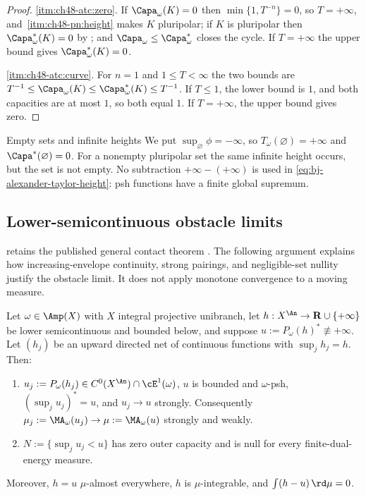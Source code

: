 \begin{proof}
\cref{itm:ch48-atc:zero}.  If $\Capa_\omega(K)=0$ then
$\min\{1,T^{-n}\}=0$, so $T=+\infty$, and
\,\cref{itm:ch48-pn:height} makes
$K$ pluripolar; if $K$ is pluripolar then
$\Capa^*_\omega(K)=0$ by ; and
$\Capa_\omega\le\Capa^*_\omega$ closes the cycle.  If $T=+\infty$ the
upper bound gives $\Capa^*_\omega(K)=0$.

\cref{itm:ch48-atc:curve}. For $n=1$ and $1\le T<\infty$ the
two bounds are
$T^{-1}\le\Capa_\omega(K)\le\Capa^*_\omega(K)\le T^{-1}$.
If $T\le1$, the lower bound is $1$, and both capacities are at most
$1$, so both equal $1$. If $T=+\infty$, the upper bound gives zero.
\end{proof}

\begin{warning}{Empty sets and infinite heights}
\label{warn:ch48-empty-height}
We put $\sup_\varnothing\phi=-\infty$, so
$T_\omega(\varnothing)=+\infty$ and
$\Capa^*(\varnothing)=0$.  For a nonempty pluripolar set the same infinite
height occurs, but the set is not empty.  No subtraction
$+\infty-(+\infty)$ is used in \eqref{eq:bj-alexander-taylor-height}:
psh functions have a finite global supremum.
\end{warning}

\subsection{Lower-semicontinuous obstacle limits}
\label{sec:ch48-discharge}

 retains the published
general contact theorem \cite[Theorem~13.1]{BJ22}.
The following argument explains how increasing-envelope continuity,
strong pairings, and negligible-set nullity justify the obstacle limit.
It does not apply monotone convergence to a moving measure.

\begin{proposition}
\label{prop:ch48-discharge}
Let $\omega\in\Amp(X)$ with $X$ integral projective unibranch, let
$h:X^{\An}\to\mathbf R\cup\{+\infty\}$ be lower semicontinuous and
bounded below, and suppose $u:=P_\omega(h)^*\not\equiv+\infty$.
Let $(h_j)$ be an upward directed net of continuous functions with
$\sup_j h_j=h$. Then:
\begin{enumerate}
\item\label{itm:ch48-dis:strong}
      $u_j:=P_\omega(h_j)\in C^0(X^{\An})\cap\cE^1(\omega)$,
      $u$ is bounded and $\omega$-psh,
      $(\sup_j u_j)^*=u$, and $u_j\to u$ strongly.
      Consequently $\mu_j:=\MA_\omega(u_j)\to\mu:=\MA_\omega(u)$
      strongly and weakly.
\item\label{itm:ch48-dis:null}
      $N:=\{\sup_j u_j<u\}$ has zero outer capacity and is null for
      every finite-dual-energy measure.
\end{enumerate}
Moreover, $h=u$ $\mu$-almost everywhere, $h$ is $\mu$-integrable, and
$\int(h-u)\,\rd\mu=0$.
\end{proposition}

